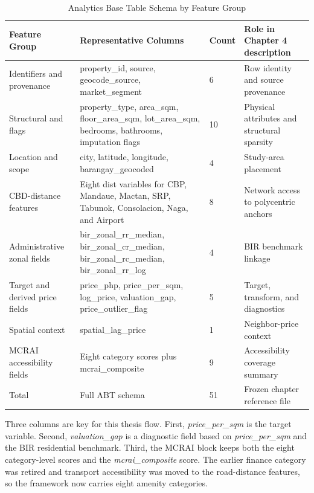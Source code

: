 \begin{table}[H]
\caption{Analytics Base Table Schema by Feature Group}
\label{tab:abt-schema}
\begin{center}
\footnotesize
\setlength{\tabcolsep}{4pt}
\begin{tabular}{L{0.18\textwidth} L{0.31\textwidth} L{0.07\textwidth} L{0.24\textwidth}}
\toprule
Feature Group & Representative Columns & Count & Role in Chapter 4 description \\
\midrule
Identifiers and provenance & property\_id, source, geocode\_source, market\_segment & 6 & Row identity and source provenance \\
Structural and flags & property\_type, area\_sqm, floor\_area\_sqm, lot\_area\_sqm, bedrooms, bathrooms, imputation flags & 10 & Physical attributes and structural sparsity \\
Location and scope & city, latitude, longitude, barangay\_geocoded & 4 & Study-area placement \\
CBD-distance features & Eight dist variables for CBP, Mandaue, Mactan, SRP, Tabunok, Consolacion, Naga, and Airport & 8 & Network access to polycentric anchors \\
Administrative zonal fields & bir\_zonal\_rr\_median, bir\_zonal\_cr\_median, bir\_zonal\_rc\_median, bir\_zonal\_rr\_log & 4 & BIR benchmark linkage \\
Target and derived price fields & price\_php, price\_per\_sqm, log\_price, valuation\_gap, price\_outlier\_flag & 5 & Target, transform, and diagnostics \\
Spatial context & spatial\_lag\_price & 1 & Neighbor-price context \\
MCRAI accessibility fields & Eight category scores plus mcrai\_composite & 9 & Accessibility coverage summary \\
\midrule
Total & Full ABT schema & 51 & Frozen chapter reference file \\
\bottomrule
\end{tabular}
\end{center}
\end{table}

Three columns are key for this thesis flow. First, \emph{price\_per\_sqm} is the target variable. Second, \emph{valuation\_gap} is a diagnostic field based on \emph{price\_per\_sqm} and the BIR residential benchmark. Third, the MCRAI block keeps both the eight category-level scores and the \emph{mcrai\_composite} score. The earlier finance category was retired and transport accessibility was moved to the road-distance features, so the framework now carries eight amenity categories.

